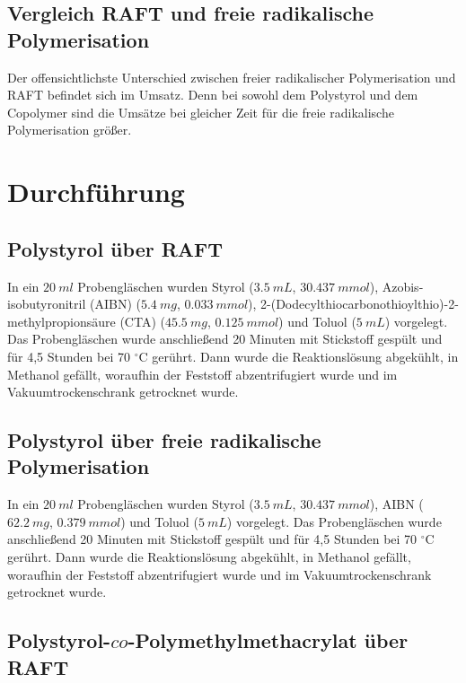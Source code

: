 \documentclass[10pt,a4paper,ngerman]{scrartcl}
\newcommand{\celsius}{^{\circ}\mathrm{C}}
\begin{document}
\subsection{Vergleich RAFT und freie radikalische Polymerisation}

		Der offensichtlichste Unterschied zwischen freier radikalischer Polymerisation und RAFT befindet sich im Umsatz. Denn bei sowohl dem Polystyrol und dem Copolymer 
		sind die Umsätze bei gleicher Zeit für die freie radikalische Polymerisation größer. 


\section{Durchführung}

	\subsection{Polystyrol über RAFT}

		In ein $\SI{20}{ml}$ Probengläschen wurden Styrol ($\SI{3,5}{mL}$, $\SI{30,437}{mmol}$), Azobis-isobutyronitril (AIBN) ($\SI{5,4}{mg}$, $\SI{0,033}{mmol}$), 
		2-(Dodecylthiocarbonothioylthio)-2-methylpropionsäure (CTA) ($\SI{45,5}{mg}$, $\SI{0,125}{mmol}$) und Toluol ($\SI{5}{mL}$) vorgelegt. Das Probengläschen wurde 
		anschließend 20 Minuten mit Stickstoff gespült und für 4,5 Stunden bei 70 $\celsius$ gerührt. Dann wurde die Reaktionslösung abgekühlt, in Methanol gefällt, 
		woraufhin der Feststoff abzentrifugiert wurde und im Vakuumtrockenschrank getrocknet wurde.

	\subsection{Polystyrol über freie radikalische Polymerisation}

		In ein $\SI{20}{ml}$ Probengläschen wurden Styrol ($\SI{3,5}{mL}$, $\SI{30,437}{mmol}$), AIBN ($\SI{62,2}{mg}$, $\SI{0,379}{mmol}$) und Toluol ($\SI{5}{mL}$) 
		vorgelegt. Das Probengläschen wurde anschließend 20 Minuten mit Stickstoff gespült und für 4,5 Stunden bei 70 $\celsius$ gerührt. Dann wurde die Reaktionslösung 
		abgekühlt, in Methanol gefällt, woraufhin der Feststoff abzentrifugiert wurde und im Vakuumtrockenschrank getrocknet wurde.
	
	\subsection{Polystyrol-$co$-Polymethylmethacrylat über RAFT}
\end{document}
